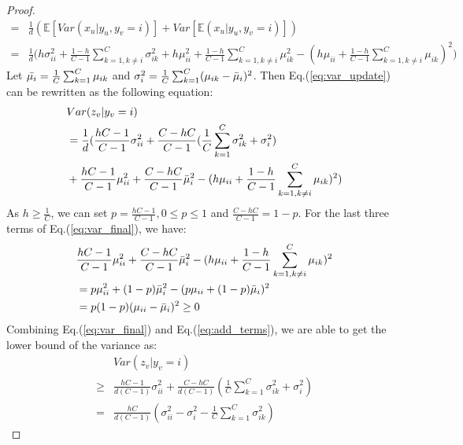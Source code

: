 \begin{proof}
\begin{equation}
\begin{aligned}
        = & \frac{1}{d} (\mathbb{E}[Var({x}_u|y_u,y_v=i)] + Var[\mathbb{E}({x}_u|y_u, y_v=i)]) \\
        = & \frac{1}{d}\Big(h\sigma_{ii}^2+\frac{1-h}{C-1}\sum_{k=1,k\neq i}^C \sigma_{ik}^2 
         + h\mu_{ii}^2  +  \frac{1-h}{C-1}\sum_{k=1,k\neq i}^C \mu_{ik}^2 - (h\mu_{ii}+\frac{1-h}{C-1}\sum_{k=1,k\neq i}^C \mu_{ik})^2\Big) 
    \end{aligned}
    \label{eq:var_update}
\end{equation}
Let $\Bar{\mu_i} = \frac{1}{C}\sum_{k=1}^C \mu_{ik}$ and $\sigma_i^2 = \frac{1}{C}\sum_{k=1}^C(\mu_{ik}-\Bar{\mu}_i)^2$. 
Then Eq.(\ref{eq:var_update}) can be rewritten as the following equation:
\begin{equation}
    \begin{aligned}
        & Var({z}_v|y_v=i) \\
        & = \frac{1}{d}(\frac{hC-1}{C-1}\sigma_{ii}^2 + \frac{C-hC}{C-1}(\frac{1}{C}\sum_{k=1}^C\sigma_{ik}^2 + \sigma_i^2) \\
        & + \frac{hC-1}{C-1}\mu_{ii}^2 + \frac{C-hC}{C-1}\Bar{\mu}_{i}^2 - (h\mu_{ii}+\frac{1-h}{C-1}\sum_{k=1,k\neq i}^C \mu_{ik})^2) 
    \end{aligned}
    \label{eq:var_final}
\end{equation}
As $h \geq \frac{1}{C}$, we can set $p=\frac{hC-1}{C-1}, 0 \leq p \leq 1$ and $\frac{C-hC}{C-1}= 1-p$. For the last three terms of Eq.(\ref{eq:var_final}), we have:
\begin{equation}
\begin{aligned}
           & \frac{hC-1}{C-1}\mu_{ii}^2 + \frac{C-hC}{C-1}\Bar{\mu}_{i}^2 - (h\mu_{ii}+\frac{1-h}{C-1}\sum_{k=1,k\neq i}^C \mu_{ik})^2 \\
    & = p \mu_{ii}^2 + (1-p) \Bar{\mu}_{i}^2 - (p\mu_{ii} + (1-p) \Bar{\mu}_{i})^2
    \\
    & = p(1-p)(\mu_{ii} - \Bar{\mu}_{i})^2 \ge 0
\end{aligned}
\label{eq:add_terms}
\end{equation}
Combining Eq.(\ref{eq:var_final}) and Eq.(\ref{eq:add_terms}), we are able to get the lower bound of the variance as:
\begin{equation}
\begin{aligned}
    & Var({z}_v|y_v=i) \\
    \geq & \frac{hC-1}{d(C-1)}\sigma_{ii}^2 + \frac{C-hC}{d(C-1)}(\frac{1}{C}\sum_{k=1}^C\sigma_{ik}^2 + \sigma_i^2) \\
    = & \frac{hC}{d(C-1)}(\sigma_{ii}^2 - \sigma_i^2- \frac{1}{C}\sum_{k=1}^{C}\sigma_{ik}^2) 

\end{aligned}
\end{equation}
\end{proof}

